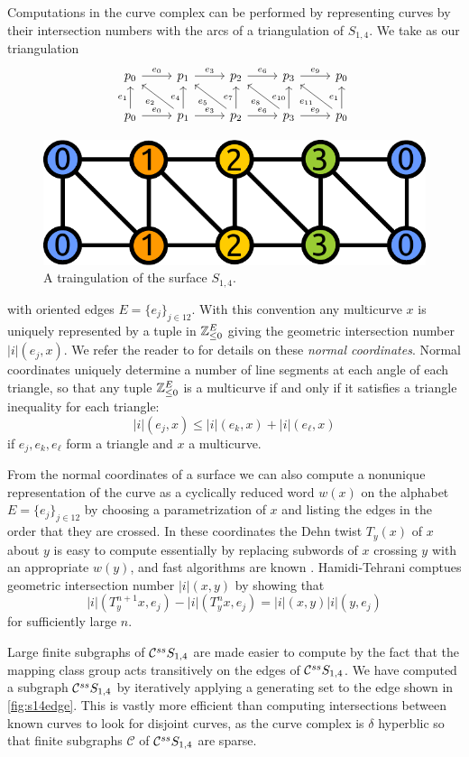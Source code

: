 Computations in the curve complex can be performed by representing curves
by their intersection numbers with the arcs of a triangulation of $S_{1,4}$.
We take as our triangulation
 $$
 \begin{tikzcd}
   p_0 \arrow{r}{e_0} & p_1 \arrow{r}{e_3} & p_2 \arrow{r}{e_6} & p_3 \arrow{r}{e_9} & p_0\\
   p_0 \arrow{r}{e_0} \arrow{u}{e_1} & p_1 \arrow{ul}{e_2} \arrow{r}{e_3} \arrow{u}{e_4} & p_2 \arrow{ul}{e_5} \arrow{r}{e_6} \arrow{u}{e_7} & p_3 \arrow{ul}{e_8} \arrow{r}{e_9}  \arrow{u}{e_{10}} & p_0 \arrow{ul}{e_{11}} \arrow{u}{e_1}
 \end{tikzcd}
 $$
 \begin{figure}[h!]
   \centering
   \includegraphics[width=.4\textwidth]{figures/s14compute.pdf}
   \caption{A traingulation of the surface $S_{1,4}$.}
   \label{fig:s14compute}
 \end{figure}
with oriented edges $E=\{e_j\}_{j \in {12}}$.
With this convention any multicurve $x$ is uniquely represented by a tuple in $\mathbb{Z}_{\leq 0}^E$ giving the geometric intersection number $|i|(e_j,x)$.
We refer the reader to \cite{Schaefer2002} for details on these \emph{normal coordinates}.
Normal coordinates
uniquely
determine a number of line segments at each angle of each triangle,
so that any tuple $\mathbb{Z}_{\leq 0}^E$ is a multicurve if and only if it satisfies a triangle inequality for each triangle:
$$
|i|(e_j,x) \leq |i|(e_k,x) + |i|(e_\ell,x)
$$
if $e_j,e_k,e_\ell$ form a triangle and $x$ a multicurve.

From the normal coordinates of a surface we can also compute a nonunique representation
of the curve as a cyclically reduced word
$w(x)$ on the alphabet $E=\{e_j\}_{j \in {12}}$ by choosing a parametrization of $x$ and listing the
edges in the order that they are crossed.
In these coordinates the Dehn twist $T_y(x)$ of $x$ about $y$ is easy to compute
essentially by replacing subwords of $x$ crossing $y$ with an appropriate $w(y)$,
and fast algorithms are known
\cite{fastdehn}.
Hamidi-Tehrani \cite{MR2695693} comptues geometric intersection number $|i|(x,y)$ by
showing that
$$|i|(T^{n+1}_y x ,e_j)-|i|(T^n_y x ,e_j) =  |i|( x ,y)|i|( y ,e_j)$$
for sufficiently large $n$.

Large finite subgraphs of $ \mathcal C^{{ss}}  S_{1,4}$ are made easier to compute by the fact that the mapping class group acts transitively on the
edges of  $ \mathcal C^{{ss}}  S_{1,4}$.
We have computed a subgraph $ \mathcal C^{{ss}}  S_{1,4}$
by iteratively applying a generating set
to the edge shown in \ref{fig:s14edge}.
This is vastly more efficient than computing intersections between known curves to look for disjoint curves,
as the curve complex is $\delta$ hyperblic
so that finite subgraphs $\mathcal C$ of $ \mathcal C^{{ss}}  S_{1,4}$
are sparse.

